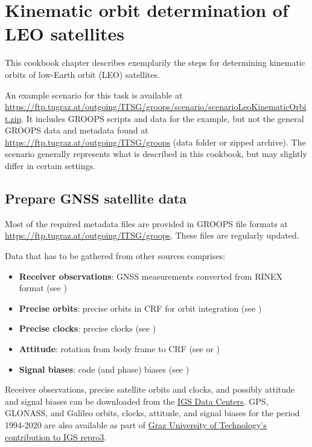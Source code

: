 \section{Kinematic orbit determination of LEO satellites}\label{cookbook.kinematicOrbit}
This cookbook chapter describes exemplarily the steps for determining kinematic orbits of low-Earth orbit (LEO) satellites.

An example scenario for this task is available at \url{https://ftp.tugraz.at/outgoing/ITSG/groops/scenario/scenarioLeoKinematicOrbit.zip}.
It includes GROOPS scripts and data for the example, but not the general GROOPS data and metadata found at \url{https://ftp.tugraz.at/outgoing/ITSG/groops} (data folder or zipped archive).
The scenario generally represents what is described in this cookbook, but may slightly differ in certain settings.

\subsection{Prepare GNSS satellite data}\label{cookbook.kinematicOrbit:gnssMetadata}
Most of the required metadata files are provided in GROOPS file formats at \url{https://ftp.tugraz.at/outgoing/ITSG/groops}.
These files are regularly updated.

Data that has to be gathered from other sources comprises:
\begin{itemize}
  \item \textbf{Receiver observations}: GNSS measurements converted from RINEX format (see )
  \item \textbf{Precise orbits}: precise orbits in CRF for orbit integration (see )
  \item \textbf{Precise clocks}: precise clocks (see )
  \item \textbf{Attitude}: rotation from body frame to CRF (see  or )
  \item \textbf{Signal biases}: code (and phase) biases (see )
\end{itemize}
Receiver observations, precise satellite orbits and clocks, and possibly attitude and signal biases can be downloaded from the
\href{https://igs.org/data-products-overview/}{IGS Data Centers}.
GPS, GLONASS, and Galileo orbits, clocks, attitude, and signal biases for the period 1994-2020 are also available as part of
\href{https://doi.org/10.3217/dataset-4528-0723-0867}{Graz University of Technology's contribution to IGS repro3}.

